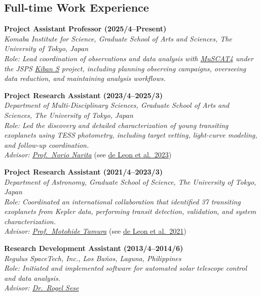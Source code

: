 \documentclass[12pt,letterpaper]{article}
\begin{document}
\subsection{Full-time Work Experience}
\begin{list}{}{\cvlist}

    \item
        \textbf{Project Assistant Professor (2025/4--Present)} \\
        \textit{Komaba Institute for Science, Graduate School of Arts and Sciences, The University of Tokyo, Japan} \\
        \textit{Role: Lead coordination of observations and data analysis with \href{\muscatLCOurl}{MuSCAT4} under the JSPS \href{\kibanSurl}{Kiban S} project, including planning observing campaigns, overseeing data reduction, and maintaining analysis workflows.}
        
    \item
        \textbf{Project Research Assistant (2023/4--2025/3)} \\
        \textit{Department of Multi-Disciplinary Sciences, Graduate School of Arts and Sciences, The University of Tokyo, Japan} \\
        \textit{Role: Led the discovery and detailed characterization of young transiting exoplanets using TESS photometry, including target vetting, light-curve modeling, and follow-up coordination.}\\
        \textit{Advisor: \href{\naritaurl}{Prof.\ Norio Narita}} (see \href{\paperthree}{de Leon et al.\ 2023})

    \item
        \textbf{Project Research Assistant (2021/4--2023/3)} \\
        \textit{Department of Astronomy, Graduate School of Science, The University of Tokyo, Japan} \\
        \textit{Role: Coordinated an international collaboration that identified 37 transiting exoplanets from Kepler data, performing transit detection, validation, and system characterization.}\\
        \textit{Advisor: \href{\tamuraurl}{Prof.\ Motohide Tamura}} (see \href{\papertwo}{de Leon et al.\ 2021})
        
    \item
        \textbf{Research Development Assistant (2013/4--2014/6)}\\
        \textit{Regulus SpaceTech, Inc., Los Ba\~nos, Laguna, Philippines}\\
        \textit{Role: Initiated and implemented software for automated solar telescope control and data analysis.}\\
        \textit{Advisor: \href{\seseurl}{Dr.\ Rogel Sese}}

\end{list}
\end{document}
